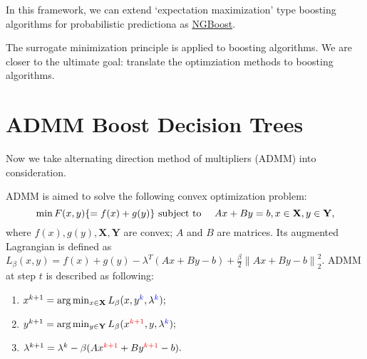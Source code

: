 \documentclass[UTF8]{article}
\begin{document}
In this framework, we can extend  `expectation maximization' type boosting algorithms for probabilistic predictiona as 
\href{https://arxiv.org/abs/1910.03225}{NGBoost}.

The surrogate minimization principle is applied to boosting algorithms.
We are closer to the ultimate goal: translate the optimziation methods to boosting algorithms.


\section{ADMM Boost Decision Trees}

Now  we take alternating direction method of multipliers (ADMM) into consideration.

ADMM is aimed to solve the following convex optimization problem:
\begin{equation}
\min F(x,y) \{=f(x)+g(y)\}  \\
        \text{  subject to }\quad  Ax+By =b, x\in\mathbf{X}, y\in\mathbf{Y},\label{ADMM}
\end{equation}
where $f(x),g(y), \mathbf{X, Y}$ are convex; ${A}$ and ${B}$ are matrices.
Its augmented Lagrangian is defined as $L_{\beta}(x, y)=f(x)+g(y) - \lambda^{T}(Ax + By -b)+ \frac{\beta}{2}{\|Ax + By - b\|}_{2}^{2}$.
ADMM at step $t$ is described as following:
\begin{enumerate}
\item $x^{k+1}=\arg\min_{x\in\mathbf{X}}L_{\beta}(x,y^{\color{blue}{k}},\lambda^{\color{blue}{k}});$
\item $y^{k+1}=\arg\min_{y\in\mathbf{Y}} L_{\beta}(x^{\color{red}{k+1}}, y, \lambda^{\color{blue}{k}});$
\item $\lambda^{k+1} = \lambda^{k} - \beta (Ax^{\color{red}{k+1}} + By^{\color{red}{k+1}}-b).$
\end{enumerate}

\end{document}
